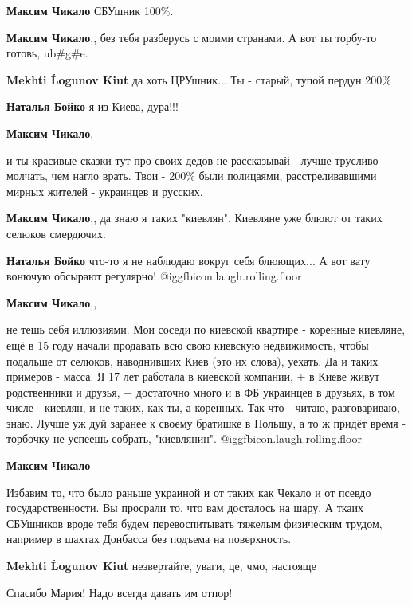 \begin{itemize}
\begin{itemize}
\textbf{Максим Чикало} СБУшник 100\%.

\textbf{Максим Чикало},, без тебя разберусь с моими странами. А вот ты торбу-то готовь, ub\#g\#e.

\textbf{Mekhti Ĺogunov Kiut} да хоть ЦРУшник...
Ты - старый, тупой пердун 200\%

\textbf{Наталья Бойко} я из Киева, дура!!!

\textbf{Максим Чикало}, 

и ты красивые сказки тут про своих дедов не рассказывай - лучше трусливо
молчать, чем нагло врать. Твои - 200\% были полицаями, расстреливавшими мирных
жителей - украинцев и русских.

\textbf{Максим Чикало},, да знаю я таких "киевлян". Киевляне уже блюют от таких селюков смердючих.

\textbf{Наталья Бойко} что-то я не наблюдаю вокруг себя блюющих...
А вот вату вонючую обсырают регулярно!  @igg{fbicon.laugh.rolling.floor} 

\textbf{Максим Чикало},, 

не тешь себя иллюзиями. Мои соседи по киевской квартире - коренные киевляне,
ещё в 15 году начали продавать всю свою киевскую недвижимость, чтобы подальше
от селюков, наводнивших Киев (это их слова), уехать. Да и таких примеров -
масса. Я 17 лет работала в киевской компании, + в Киеве живут родственники и
друзья, + достаточно много и в ФБ украинцев в друзьях, в том числе - киевлян, и
не таких, как ты, а коренных. Так что - читаю, разговариваю, знаю. Лучше уж дуй
заранее к своему братишке в Польшу, а то ж придёт время - торбочку не успеешь
собрать, "киевлянин".  @igg{fbicon.laugh.rolling.floor} 

\textbf{Максим Чикало} 

Избавим то, что было раньше украиной и от таких как Чекало и от псевдо
государственности. Вы просрали то, что вам досталось на шару. А ткаих СБУшников
вроде тебя будем перевоспитывать тяжелым физическим трудом, например в шахтах
Донбасса без подъема на поверхность.

\textbf{Mekhti Ĺogunov Kiut} незвертайте, уваги, це, чмо, настояще

Спасибо Мария! Надо всегда давать им отпор!

\end{itemize} %


\end{itemize}
